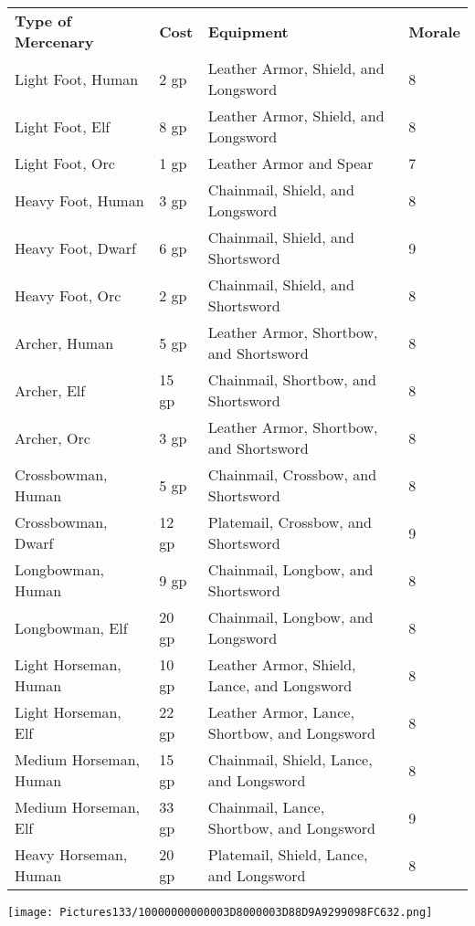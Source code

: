 \documentclass[a4paper,twoside,openany,10pt]{book}
\begin{document}
\begin{tabular*}{0.93\linewidth}{@{\extracolsep{\fill}}llll}
\textbf{Type of Mercenary}&\textbf{Cost}&\textbf{Equipment}&\textbf{Morale}\\
Light Foot, Human&2 gp&Leather Armor, Shield, and Longsword&8\\\toprule
Light Foot, Elf&8 gp&Leather Armor, Shield, and Longsword&8\\\hline
Light Foot, Orc&1 gp&Leather Armor and Spear&7\\\hline
Heavy Foot, Human&3 gp&Chainmail, Shield, and Longsword&8\\\hline
Heavy Foot, Dwarf&6 gp&Chainmail, Shield, and Shortsword&9\\\hline
Heavy Foot, Orc&2 gp&Chainmail, Shield, and Shortsword&8\\\hline
Archer, Human&5 gp&Leather Armor, Shortbow, and Shortsword&8\\\hline
Archer, Elf&15 gp&Chainmail, Shortbow, and Shortsword&8\\\hline
Archer, Orc&3 gp&Leather Armor, Shortbow, and Shortsword&8\\\hline
Crossbowman, Human&5 gp&Chainmail, Crossbow, and Shortsword&8\\\hline
Crossbowman, Dwarf&12 gp&Platemail, Crossbow, and Shortsword&9\\\hline
Longbowman, Human&9 gp&Chainmail, Longbow, and Shortsword&8\\\hline
Longbowman, Elf&20 gp&Chainmail, Longbow, and Longsword&8\\\hline
Light Horseman, Human&10 gp&Leather Armor, Shield, Lance, and Longsword&8\\\hline
Light Horseman, Elf&22 gp&Leather Armor, Lance, Shortbow, and Longsword&8\\\hline
Medium Horseman, Human&15 gp&Chainmail, Shield, Lance, and Longsword&8\\\hline
Medium Horseman, Elf&33 gp&Chainmail, Lance, Shortbow, and Longsword&9\\\hline
Heavy Horseman, Human&20 gp&Platemail, Shield, Lance, and Longsword&8\\\hline
\end{tabular*}

\vfill

\begin{center}
	\texttt{[image: Pictures133/10000000000003D8000003D88D9A9299098FC632.png]}
\end{center}

\pagebreak
\end{document}
